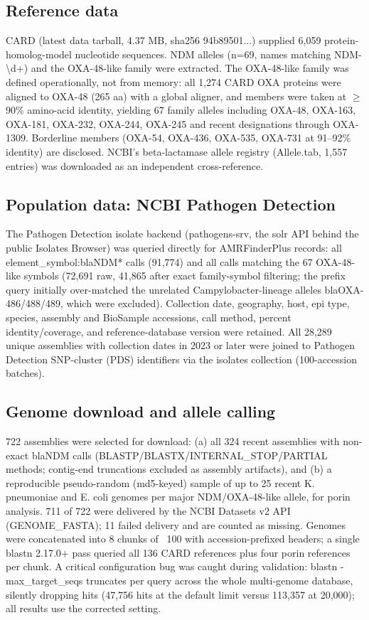 \documentclass[11pt]{article}
\begin{document}
\subsection{Reference data}
CARD (latest data tarball, 4.37 MB, sha256 94b89501...) supplied 6,059 protein-homolog-model nucleotide sequences. NDM alleles (n=69, names matching NDM-\textbackslash d+) and the OXA-48-like family were extracted. The OXA-48-like family was defined operationally, not from memory: all 1,274 CARD OXA proteins were aligned to OXA-48 (265 aa) with a global aligner, and members were taken at $\geq$90\% amino-acid identity, yielding 67 family alleles including OXA-48, OXA-163, OXA-181, OXA-232, OXA-244, OXA-245 and recent designations through OXA-1309. Borderline members (OXA-54, OXA-436, OXA-535, OXA-731 at 91--92\% identity) are disclosed. NCBI's beta-lactamase allele registry (Allele.tab, 1,557 entries) was downloaded as an independent cross-reference.

\subsection{Population data: NCBI Pathogen Detection}
The Pathogen Detection isolate backend (pathogens-srv, the solr API behind the public Isolates Browser) was queried directly for AMRFinderPlus records: all element\_symbol:blaNDM* calls (91,774) and all calls matching the 67 OXA-48-like symbols (72,691 raw, 41,865 after exact family-symbol filtering; the prefix query initially over-matched the unrelated Campylobacter-lineage alleles blaOXA-486/488/489, which were excluded). Collection date, geography, host, epi type, species, assembly and BioSample accessions, call method, percent identity/coverage, and reference-database version were retained. All 28,289 unique assemblies with collection dates in 2023 or later were joined to Pathogen Detection SNP-cluster (PDS) identifiers via the isolates collection (100-accession batches).

\subsection{Genome download and allele calling}
722 assemblies were selected for download: (a) all 324 recent assemblies with non-exact blaNDM calls (BLASTP/BLASTX/INTERNAL\_STOP/PARTIAL methods; contig-end truncations excluded as assembly artifacts), and (b) a reproducible pseudo-random (md5-keyed) sample of up to 25 recent K. pneumoniae and E. coli genomes per major NDM/OXA-48-like allele, for porin analysis. 711 of 722 were delivered by the NCBI Datasets v2 API (GENOME\_FASTA); 11 failed delivery and are counted as missing. Genomes were concatenated into 8 chunks of ~100 with accession-prefixed headers; a single blastn 2.17.0+ pass queried all 136 CARD references plus four porin references per chunk. A critical configuration bug was caught during validation: blastn -max\_target\_seqs truncates per query across the whole multi-genome database, silently dropping hits (47,756 hits at the default limit versus 113,357 at 20,000); all results use the corrected setting.
\end{document}
